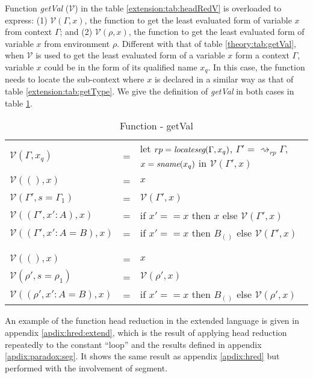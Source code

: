 Function \emph{getVal} ($\mathcal{V}$) in the table \ref{extension:tab:headRedV} is overloaded to express: (1) $\mathcal{V}(\Gamma, x)$, the function to get the least evaluated form of variable $x$ from context $\Gamma$; and (2) $\mathcal{V}(\rho, x)$, the function to get the least evaluated form of variable $x$ from environment $\rho$. Different with that of table \ref{theory:tab:getVal}, when $\mathcal{V}$ is used to get the least evaluated form of a variable $x$ form a context $\Gamma$, variable $x$ could be in the form of its qualified name $x_q$. In this case, the function needs to locate the sub-context where $x$ is declared in a similar way as that of table \ref{extension:tab:getType}. We give the definition of \emph{getVal} in both cases in table \ref{extension:tab:getVal}.
\begin{table}[h]
  \centering
  \begin{tabular}{l l l}
    $\mathcal{V}(\Gamma, x_q)$ & = &  let $rp = \emph{locateseg}(\Gamma, x_q)$, $\Gamma' = \rightsquigarrow_{rp}\Gamma$, $x=\emph{sname}(x_q)$ in $\mathcal{V}(\Gamma',x)$ \\
    $\mathcal{V}((), x)$ & = & $x$ \\
    $\mathcal{V}(\Gamma', s=\Gamma_1)$ & = & $\mathcal{V}(\Gamma', x)$ \\
    $\mathcal{V}((\Gamma', x' : A), x)$ & = & if $x' == x$ then $x$ else $\mathcal{V}(\Gamma', x)$ \\
    $\mathcal{V}((\Gamma', x' : A = B), x)$ & = & if $x' == x$ then $B_{()}$ else $\mathcal{V}(\Gamma', x)$ \\
    \\
    \hline
    \\
    $\mathcal{V}((), x)$ & = & $x$ \\
    $\mathcal{V}(\rho', s=\rho_1)$ & = & $\mathcal{V}(\rho', x)$ \\
    $\mathcal{V}((\rho', x' : A = B), x)$ & = & if $x' == x$ then $B_{()}$ else $\mathcal{V}(\rho', x)$ 
  \end{tabular}
  \caption{Function - getVal}
  \label{extension:tab:getVal}
\end{table}

An example of the function head reduction in the extended language is given in appendix \ref{apdix:hred:extend}, which is the result of applying head reduction repeatedly to the constant ``loop'' and the results defined in appendix \ref{apdix:paradox:seg}. It shows the same result as appendix \ref{apdix:hred} but performed with the involvement of segment.